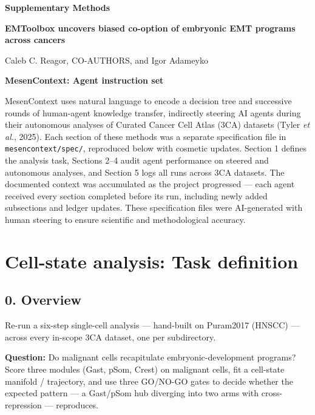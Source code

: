 \documentclass[11pt,a4paper]{article}
\begin{document}
{\Large\bfseries Supplementary Methods\par}\vspace{8pt}
{\bfseries EMToolbox uncovers biased co-option of embryonic EMT programs across cancers\par}\vspace{2pt}
Caleb C. Reagor, CO-AUTHORS, and Igor Adameyko\par\vspace{14pt}
{\bfseries MesenContext: Agent instruction set\par}\vspace{2pt}
MesenContext uses natural language to encode a decision tree and successive rounds of
human-agent knowledge transfer, indirectly steering AI agents during their autonomous analyses
of Curated Cancer Cell Atlas (3CA) datasets (Tyler \textit{et al.}, 2025). Each section of these methods was a separate specification file in \texttt{mesencontext/spec/}, reproduced below with cosmetic updates. Section 1 defines the analysis task, Sections 2--4 audit agent performance on steered and
autonomous analyses, and Section 5 logs all runs across 3CA datasets. The documented context was accumulated as the project progressed --- each agent
received every section completed before its run, including newly added subsections and ledger
updates. These
specification files were AI-generated with human steering to ensure scientific and methodological
accuracy.\par\vspace{12pt}
{\setlength{\parskip}{0pt}\tableofcontents}

\hypertarget{sec:1}{%
\section{Cell-state analysis: Task definition}\label{sec:1}}

\hypertarget{overview}{%
\subsection{0. Overview}\label{overview}}

Re-run a six-step single-cell analysis --- hand-built on Puram2017 (HNSCC) --- across every in-scope 3CA dataset, one per
subdirectory.

\textbf{Question:} Do malignant cells recapitulate embryonic-development
programs? Score three modules (Gast, pSom, Crest) on malignant cells,
fit a cell-state manifold / trajectory, and use three GO/NO-GO gates to
decide whether the expected pattern --- a Gast/pSom hub diverging into
two arms with cross-repression --- reproduces.
\end{document}
